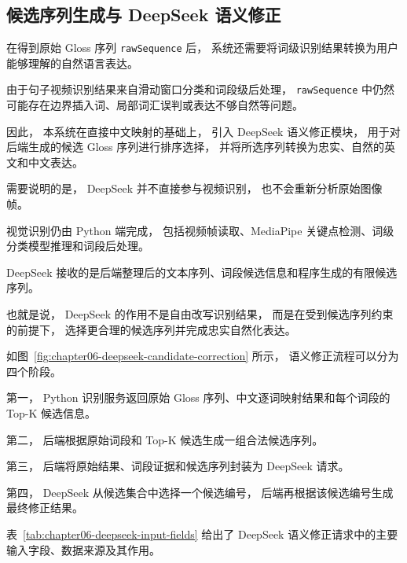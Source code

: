 
\subsection{候选序列生成与 DeepSeek 语义修正}

在得到原始 Gloss 序列 \texttt{rawSequence} 后，
系统还需要将词级识别结果转换为用户能够理解的自然语言表达。

由于句子视频识别结果来自滑动窗口分类和词段级后处理，
\texttt{rawSequence} 中仍然可能存在边界插入词、局部词汇误判或表达不够自然等问题。

因此，
本系统在直接中文映射的基础上，
引入 DeepSeek 语义修正模块，
用于对后端生成的候选 Gloss 序列进行排序选择，
并将所选序列转换为忠实、自然的英文和中文表达。

需要说明的是，
DeepSeek 并不直接参与视频识别，
也不会重新分析原始图像帧。

视觉识别仍由 Python 端完成，
包括视频帧读取、MediaPipe 关键点检测、词级分类模型推理和词段后处理。

DeepSeek 接收的是后端整理后的文本序列、词段候选信息和程序生成的有限候选序列。

也就是说，
DeepSeek 的作用不是自由改写识别结果，
而是在受到候选序列约束的前提下，
选择更合理的候选序列并完成忠实自然化表达。


如图~\ref{fig:chapter06-deepseek-candidate-correction} 所示，
语义修正流程可以分为四个阶段。

第一，
Python 识别服务返回原始 Gloss 序列、中文逐词映射结果和每个词段的 Top-K 候选信息。

第二，
后端根据原始词段和 Top-K 候选生成一组合法候选序列。

第三，
后端将原始结果、词段证据和候选序列封装为 DeepSeek 请求。

第四，
DeepSeek 从候选集合中选择一个候选编号，
后端再根据该候选编号生成最终修正结果。

表~\ref{tab:chapter06-deepseek-input-fields} 给出了 DeepSeek 语义修正请求中的主要输入字段、数据来源及其作用。

